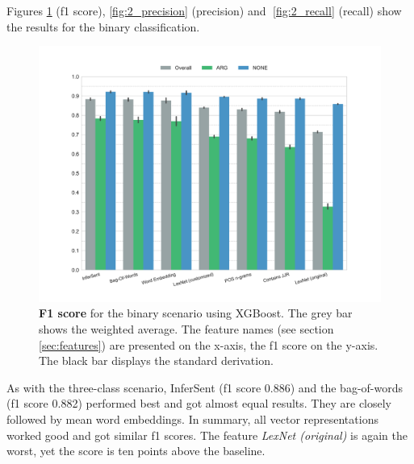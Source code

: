 Figures \ref{fig:2_f1} (f1 score), \ref{fig:2_precision} (precision) and \ref{fig:2_recall} (recall) show the results for the binary classification.
\begin{figure}[htbp]
      \caption{\textbf{F1 score} for the binary scenario using XGBoost. The grey bar shows the weighted average. The feature names (see section \ref{sec:features}) are presented on the x-axis, the f1 score on the y-axis. The black bar displays the standard derivation.} 
 
    \label{fig:2_f1}
 \centering
	\includegraphics[width=1\textwidth]{images/experiments/f1-True}

\end{figure}
As with the three-class scenario, InferSent (f1 score 0.886) and the bag-of-words (f1 score 0.882) performed best and got almost equal results. They are closely followed by mean word embeddings. In summary, all vector representations worked good and got similar f1 scores. The feature \emph{LexNet (original)} is again the worst, yet the score is ten points above the baseline.%






